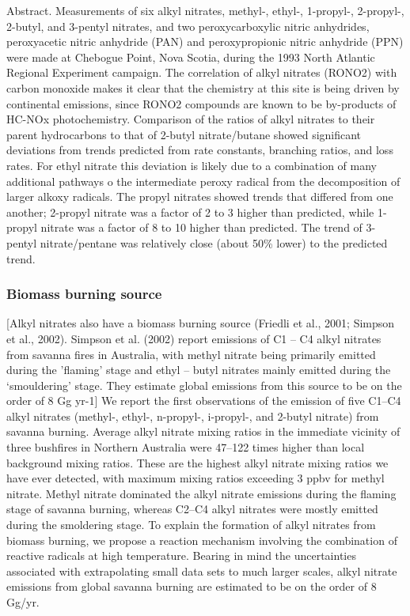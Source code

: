 \documentclass[11pt,a4paper]{article}
\begin{document}
Abstract. Measurements of six alkyl nitrates, methyl-, ethyl-, 1-propyl-, 2-propyl-, 2-butyl, and 3-pentyl nitrates, and two peroxycarboxylic nitric anhydrides, peroxyacetic nitric anhydride
(PAN) and peroxypropionic nitric anhydride (PPN) were made
at Chebogue Point, Nova Scotia, during the 1993 North Atlantic
Regional Experiment campaign. The correlation of alkyl nitrates
(RONO2) with carbon monoxide makes it clear that the chemistry at this site is being driven by continental emissions, since RONO2 compounds are known to be by-products of HC-NOx photochemistry.
Comparison of the ratios of alkyl nitrates to their parent hydrocarbons to that of 2-butyl nitrate/butane showed significant
deviations from trends predicted from rate constants, branching
ratios, and loss rates. For ethyl nitrate this deviation is likely due to a combination of many additional pathways  o the intermediate
peroxy radical from the decomposition of larger alkoxy radicals.
The propyl nitrates showed trends that differed from one another; 2-propyl nitrate was a factor of 2 to 3 higher than predicted, while 1-propyl nitrate was a factor of 8 to 10 higher than predicted. The trend of 3-pentyl nitrate/pentane was relatively close (about
50\% lower) to the predicted trend.

\subsubsection*{Biomass burning source}
\citep{Newland2013}
[Alkyl nitrates also have a biomass burning source (Friedli et al., 2001; Simpson et al., 2002). Simpson et al. (2002) report emissions of C1 – C4 alkyl nitrates from savanna fires in Australia, with methyl nitrate being primarily emitted during the ’flaming’ stage and ethyl – butyl nitrates mainly emitted during the ‘smouldering’ stage. They estimate global emissions from this source to be on the order of 8 Gg yr-1]
\citep{Simpson2002}
We report the first observations of the emission of five C1–C4 alkyl nitrates (methyl-, ethyl-, n-propyl-, i-propyl-, and 2-butyl nitrate) from savanna burning. Average alkyl nitrate mixing ratios in the immediate vicinity of three bushfires in Northern Australia were 47–122 times higher than local background mixing ratios. These are the highest alkyl nitrate mixing ratios we have ever detected, with maximum mixing ratios exceeding 3 ppbv for methyl nitrate. Methyl nitrate dominated the alkyl nitrate emissions during the flaming stage of savanna burning, whereas C2–C4 alkyl nitrates were mostly emitted during the smoldering stage. To explain the formation of alkyl nitrates from biomass burning, we propose a reaction mechanism involving the combination of reactive radicals at high temperature. Bearing in mind the uncertainties associated with extrapolating small data sets to much larger scales, alkyl nitrate emissions from global savanna burning are estimated to be on the order of 8 Gg/yr.
\end{document}
